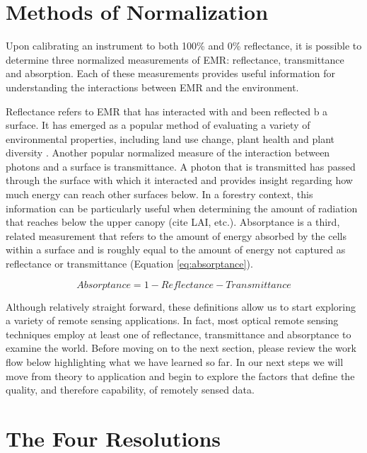 \documentclass[
]{book}
\begin{document}
\hypertarget{methods-of-normalization}{%
\section{Methods of Normalization}\label{methods-of-normalization}}

Upon calibrating an instrument to both 100\% and 0\% reflectance, it is
possible to determine three normalized measurements of EMR: reflectance,
transmittance and absorption. Each of these measurements provides useful
information for understanding the interactions between EMR and the
environment.

Reflectance refers to EMR that has interacted with and been reflected b
a surface. It has emerged as a popular method of evaluating a variety of
environmental properties, including land use change, plant health and
plant diversity \citep{asner_spectroscopy_2011}. Another popular normalized measure of the
interaction between photons and a surface is transmittance. A photon
that is transmitted has passed through the surface with which it
interacted and provides insight regarding how much energy can reach
other surfaces below. In a forestry context, this information can be
particularly useful when determining the amount of radiation that
reaches below the upper canopy (cite LAI, etc.). Absorptance is a third,
related measurement that refers to the amount of energy absorbed by
the cells within a surface and is roughly equal to the amount of
energy not captured as reflectance or transmittance (Equation
\eqref{eq:absorptance}).

\begin{equation}
Absorptance = 1 - Reflectance - Transmittance 
\label{eq:absorptance}
\end{equation}

Although relatively straight forward, these definitions allow us to
start exploring a variety of remote sensing applications. In fact, most
optical remote sensing techniques employ at least one of reflectance,
transmittance and absorptance to examine the world. Before moving on to
the next section, please review the work flow below highlighting what we
have learned so far. In our next steps we will move from theory to
application and begin to explore the factors that define the quality,
and therefore capability, of remotely sensed data.

\hypertarget{the-four-resolutions}{%
\section{The Four Resolutions}\label{the-four-resolutions}}
\end{document}

